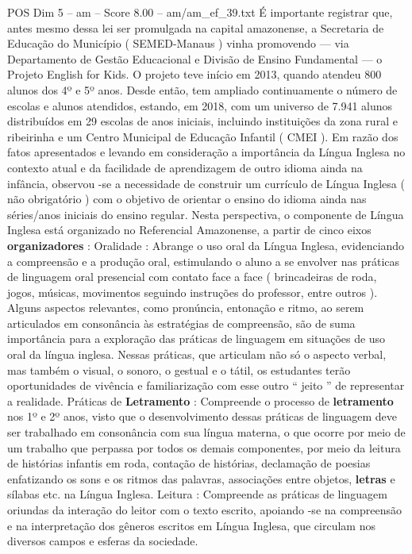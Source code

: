 \begin{textsample}{POS Dim 5 – am – Score 8.00 – am/am\_ef\_39.txt}  \label{ex:f5_pos_068}
É importante registrar que, antes mesmo dessa lei ser promulgada na capital amazonense, a Secretaria de Educação do Município ( SEMED-Manaus ) vinha promovendo — via Departamento de Gestão Educacional e Divisão de Ensino Fundamental — o Projeto English for Kids.
O projeto teve início em 2013, quando atendeu 800 alunos dos 4º e 5º anos.
Desde então, tem ampliado continuamente o número de escolas e alunos atendidos, estando, em 2018, com um universo de 7.941 alunos distribuídos em 29 escolas de anos iniciais, incluindo instituições da zona rural e ribeirinha e um Centro Municipal de Educação Infantil ( CMEI ).
Em razão dos fatos apresentados e levando em consideração a importância da Língua Inglesa no contexto atual e da facilidade de aprendizagem de outro idioma ainda na infância, observou -se a necessidade de construir um currículo de Língua Inglesa ( não obrigatório ) com o objetivo de orientar o ensino do idioma ainda nas séries/anos iniciais do ensino regular.
Nesta perspectiva, o componente de Língua Inglesa está organizado no Referencial Amazonense, a partir de cinco eixos \textbf{organizadores} : Oralidade : Abrange o uso oral da Língua Inglesa, evidenciando a compreensão e a produção oral, estimulando o aluno a se envolver nas práticas de linguagem oral presencial com contato face a face ( brincadeiras de roda, jogos, músicas, movimentos seguindo instruções do professor, entre outros ).
Alguns aspectos relevantes, como pronúncia, entonação e ritmo, ao serem articulados em consonância às estratégias de compreensão, são de suma importância para a exploração das práticas de linguagem em situações de uso oral da língua inglesa.
Nessas práticas, que articulam não só o aspecto verbal, mas também o visual, o sonoro, o gestual e o tátil, os estudantes terão oportunidades de vivência e familiarização com esse outro “ jeito ” de representar a realidade.
Práticas de \textbf{Letramento} : Compreende o processo de \textbf{letramento} nos 1º e 2º anos, visto que o desenvolvimento dessas práticas de linguagem deve ser trabalhado em consonância com sua língua materna, o que ocorre por meio de um trabalho que perpassa por todos os demais componentes, por meio da leitura de histórias infantis em roda, contação de histórias, declamação de poesias enfatizando os sons e os ritmos das palavras, associações entre objetos, \textbf{letras} e sílabas etc. na Língua Inglesa.
Leitura : Compreende as práticas de linguagem oriundas da interação do leitor com o texto escrito, apoiando -se na compreensão e na interpretação dos gêneros escritos em Língua Inglesa, que circulam nos diversos campos e esferas da sociedade.

\end{textsample}
